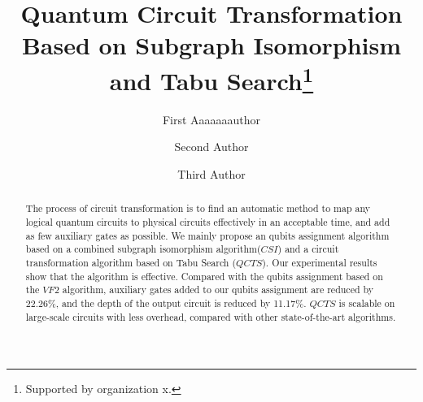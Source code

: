 \documentclass[runningheads]{llncs}
\begin{document}
%
\title{Quantum Circuit Transformation Based on Subgraph Isomorphism and Tabu Search\thanks{Supported by organization x.}}
%
%
\author{First Aaaaaaauthor \and
Second Author \and
Third Author}
%
%
%
\maketitle              %
%
\begin{abstract}
	The process of circuit transformation is to find an automatic method to map any logical quantum circuits to physical circuits effectively in an acceptable time, and add as few auxiliary gates as possible. We mainly propose an qubits assignment algorithm based on a combined subgraph isomorphism algorithm($CSI$) and a circuit transformation algorithm based on Tabu Search ($QCTS$). Our experimental results show that the algorithm is effective. Compared with the qubits assignment based on the $VF2$ algorithm, auxiliary gates added to our qubits assignment are reduced by 22.26\%, and the depth of the output circuit is reduced by 11.17\%. $QCTS$ is scalable on large-scale circuits with less overhead, compared with other state-of-the-art algorithms.
\end{abstract}
\end{document}
